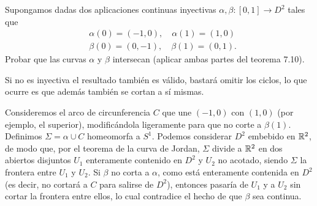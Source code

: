 \documentclass[twoside]{article}
\begin{document}
\newpage

\begin{ejercicio}{7.5}
Supongamos dadas dos aplicaciones continuas inyectivas $\alpha,\beta:[0,1]\to D^2$ tales que 
\begin{align*}
&\alpha(0)=(-1,0), \quad \alpha(1)=(1,0)\\
&\beta(0)=(0,-1), \quad \beta(1)=(0,1).
\end{align*}
Probar que las curvas $\alpha$ y $\beta$ intersecan (aplicar ambas partes del teorema 7.10). 
\end{ejercicio}
\begin{solucion}
Si no es inyectiva el resultado también es válido, bastará omitir los ciclos, lo que ocurre es que además también se cortan a sí mismas.

Consideremos el arco de circunferencia $C$ que une $(-1,0)$ con $(1,0)$ (por ejemplo, el superior), modificándola ligeramente para que no corte a $\beta(1)$. Definimos $\Sigma=\alpha\cup C$ homeomorfa a $S^1$. Podemos considerar $D^2$ embebido en $\mathbb{R}^2$, de modo que, por el teorema de la curva de Jordan, $\Sigma$ divide a $\mathbb{R}^2$ en dos abiertos disjuntos $U_1$ enteramente contenido en $D^2$ y $U_2$ no acotado, siendo $\Sigma$ la frontera entre $U_1$ y $U_2$. Si $\beta$ no corta a $\alpha$, como está enteramente contenida en $D^2$ (es decir, no cortará a $C$ para salirse de $D^2$), entonces pasaría de $U_1$ y a $U_2$ sin cortar la frontera entre ellos, lo cual contradice el hecho de que $\beta$ sea continua.
\end{solucion}
\end{document}
